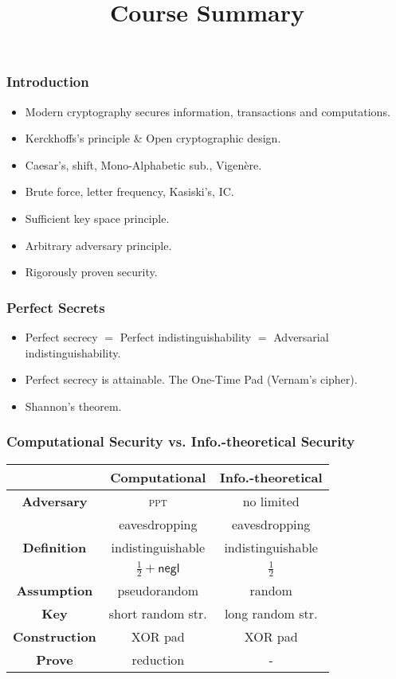 

\title{Course Summary}

	\maketitle	
\begin{frame}\frametitle{Introduction}
\begin{itemize}
\item Modern cryptography secures information, transactions and computations.
\item Kerckhoffs's principle \& Open cryptographic design.
\item Caesar's, shift, Mono-Alphabetic sub., Vigen\`{e}re.
\item Brute force, letter frequency, Kasiski's, IC.
\item Sufficient key space principle.
		\item Arbitrary adversary principle.
		\item Rigorously proven security.
	\end{itemize}
\end{frame}
\begin{frame}\frametitle{Perfect Secrets}
\begin{itemize}
\item Perfect secrecy $=$ Perfect indistinguishability $=$ Adversarial indistinguishability.
\item Perfect secrecy is attainable. The One-Time Pad (Vernam's cipher).
\item Shannon's theorem.
\end{itemize}
\end{frame}
\begin{frame}\frametitle{Computational Security vs. Info.-theoretical Security}
\begin{center}
\begin{tabular}{|c|c|c|} \hline
                      & \textbf{Computational} & \textbf{Info.-theoretical} \\ \hline
\textbf{Adversary}    & \textsc{ppt} & no limited \\ 
                      & eavesdropping & eavesdropping\\ \hline 
\textbf{Definition}   & indistinguishable & indistinguishable \\ 
                      & $\frac{1}{2} + \mathsf{negl}$ & $\frac{1}{2}$ \\ \hline
\textbf{Assumption}   & pseudorandom & random   \\ \hline
\textbf{Key}	      & short random str. & long random str.\\ \hline
\textbf{Construction} & XOR pad & XOR pad \\ \hline 
\textbf{Prove}        & reduction & -     \\ \hline
\end{tabular}	
\end{center}
\end{frame}
